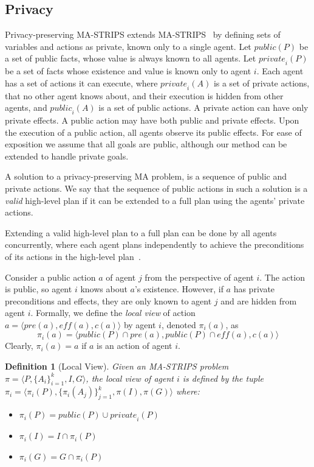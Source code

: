 \documentclass[letterpaper]{article}
\newcommand{\private}[2]{\textit{private}_{#1}(#2)}
\newcommand{\eff}{\textit{eff}}
\newcommand{\pre}{\textit{pre}}
\newcommand{\public}{\textit{public}}
\newtheorem{definition}{Definition}
\theoremstyle{definition}
\begin{document}
\subsection{Privacy}

Privacy-preserving MA-STRIPS extends MA-STRIPS~\cite{brafman2008one} by defining sets of variables and actions as private, known only to a single agent. Let $\public(P)$ be a set of public facts, whose value is always known to all agents. Let $\private{i}{P}$ be a set of facts whose existence and value is known only to agent $i$. Each agent has a set of actions it can execute, where $\private{i}{A}$ is a set of private actions, that no other agent knows about, and their execution is hidden from other agents, and $\public_i(A)$ is a set of public actions. A private action can have only private effects. A public action may have both public and private effects. Upon the execution of a public action, all agents observe its public effects. For ease of exposition we assume that all goals are public, although our method can be extended to handle private goals.

A solution to a privacy-preserving MA problem, is a sequence of public and private actions. We say that the sequence of public actions in such a solution is a {\em valid} high-level plan if it can be extended to a full plan using the agents' private actions. 

Extending a valid high-level plan to a full plan can be done by all agents concurrently, where each agent plans independently to achieve the preconditions of its actions in the high-level plan~\cite{maliah2014privacyPreserving}.

Consider a public action $a$ of agent $j$ from the perspective of agent $i$. 
The action is public, so agent $i$ knows about $a$'s existence. However, if $a$ has private preconditions and effects, they are only known to agent $j$ and are hidden from agent $i$. Formally, we define the {\em local view} of action $a=\langle \pre(a),\eff(a),c(a) \rangle$ by agent $i$, denoted $\pi_i(a)$, as 
\[ \pi_i(a)=\langle \public(P)\cap \pre(a), \public(P)\cap \eff(a), c(a) \rangle \]
Clearly, $\pi_i(a)=a$ if $a$ is an action of agent $i$. 



\begin{definition}[Local View]
Given an MA-STRIPS problem $\pi=\langle  P, \{A_i\}_{i=1}^k, I ,G \rangle$,
the {\em local view} of agent $i$ is defined by the tuple 
$\pi_i=\langle
\pi_i(P), \{\pi_i(A_j)\}_{j=1}^k,\pi(I),\pi(G)
\rangle
$
where:
\begin{itemize}
\item $\pi_i(P)=\public(P)\cup \private{i}{P}$
\item $\pi_i(I)=I \cap \pi_i(P)$
\item $\pi_i(G)=G \cap \pi_i(P)$
\end{itemize}
\label{def:local-view}
\end{definition}
\end{document}
